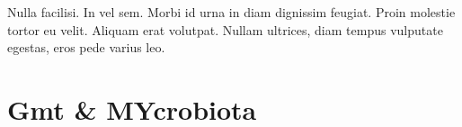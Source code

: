 \begin{savequote}[75mm]
Nulla facilisi. In vel sem. Morbi id urna in diam dignissim feugiat. Proin molestie tortor eu velit. Aliquam erat volutpat. Nullam ultrices, diam tempus vulputate egestas, eros pede varius leo.
\end{savequote}

\chapter{Gmt \& MYcrobiota}
\setcounter{figure}{-1}
\setcounter{table}{-1}
\setcounter{section}{-1}
\setcounter{NAT@ctr}{-1}

\cite{ireport}



